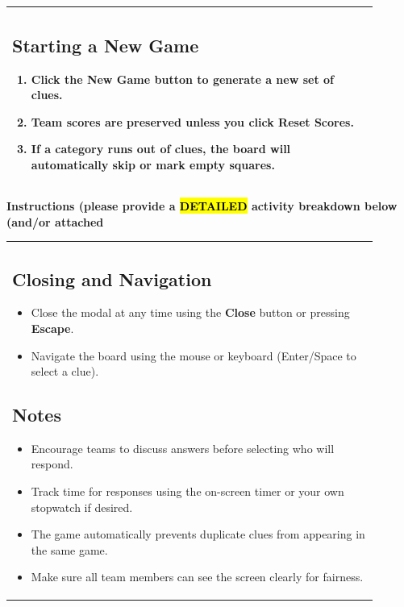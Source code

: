 \documentclass{article}
\begin{document}
\begin{flushleft}
\begin{tabular}{|p{0.9\linewidth}|}
\subsection*{Starting a New Game}

\begin{enumerate}[label=\arabic*.]
    \item Click the \textbf{New Game} button to generate a new set of clues.
    \item Team scores are preserved unless you click \textbf{Reset Scores}.
    \item If a category runs out of clues, the board will automatically skip or mark empty squares.
\end{enumerate} \\
\hline
\end{tabular}
\newpage
\vspace{0.5cm}
\noindent
{\large \textbf{Instructions (please provide a \hl{DETAILED} activity breakdown below (and/or attached}} \\
\begin{tabular}{|p{0.9\linewidth}|}
\hline
\subsection*{Closing and Navigation}

\begin{itemize}
    \item Close the modal at any time using the \textbf{Close} button or pressing \textbf{Escape}.
    \item Navigate the board using the mouse or keyboard (Enter/Space to select a clue).
\end{itemize}

\subsection*{Notes}

\begin{itemize}
    \item Encourage teams to discuss answers before selecting who will respond.
    \item Track time for responses using the on-screen timer or your own stopwatch if desired.
    \item The game automatically prevents duplicate clues from appearing in the same game.
    \item Make sure all team members can see the screen clearly for fairness.
\end{itemize} \\


\end{tabular}
\end{flushleft}
\end{document}
